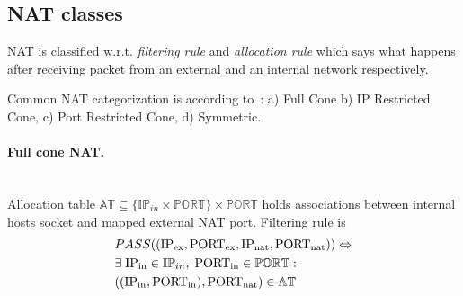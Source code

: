 \documentclass[twoside]{article}
\begin{document}
\begin{multicols}{2}
% 
% 

\subsection{NAT classes}
NAT is classified w.r.t. \emph{filtering rule} and \emph{allocation rule} which says what happens after receiving
packet from an external and an internal network respectively.

Common NAT categorization is according to~\citep{rfc3489}: a) Full Cone
b) IP Restricted Cone, c) Port Restricted Cone, d) Symmetric.

\paragraph{Full cone NAT.} ~\\
Allocation table $\mathbb{AT} \subseteq \{ \mathbb{IP}_{in} \times \mathbb{PORT} \} \times \mathbb{PORT}$ holds associations between internal 
hosts socket and mapped external NAT port. 
Filtering rule is
\begin{align*}
& PASS((\text{IP\textsubscript{ex}}, \text{PORT\textsubscript{ex}}, \text{IP\textsubscript{nat}}, \text{PORT\textsubscript{nat}} )) \Leftrightarrow \\
&  \exists \; \text{IP\textsubscript{in}} \in \mathbb{IP}_{in}, \; \text{PORT\textsubscript{in}} \in \mathbb{PORT}:\\
& ((\text{IP\textsubscript{in}}, \text{PORT\textsubscript{in}}), \text{PORT\textsubscript{nat}} ) \in \mathbb{AT}
\end{align*}
 

\end{multicols}
\end{document}
